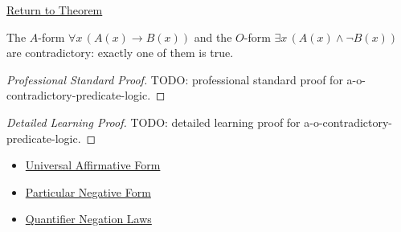 \newpage
{}
\label{prf:a-o-contradictory-predicate-logic}

\begin{remark*}[Return]
\hyperref[prop:a-o-contradictory-predicate-logic]{Return to Theorem}
\end{remark*}

\begin{proposition*}[A-O Contradiction]
The \(A\)-form \(\forall x\,(A(x)\to B(x))\) and the \(O\)-form
\(\exists x\,(A(x)\land \neg B(x))\) are contradictory: exactly one of them is
true.
\end{proposition*}

\begin{proof}[Professional Standard Proof]
\LRAProofBodyStart
TODO: professional standard proof for a-o-contradictory-predicate-logic.
\end{proof}

\begin{proof}[Detailed Learning Proof]
\LRAProofBodyStart
TODO: detailed learning proof for a-o-contradictory-predicate-logic.
\end{proof}

\begin{remark*}
\end{remark*}

\begin{dependencies}
\begin{itemize}
  \item \hyperref[def:categorical-a-form-predicate-logic]{Universal Affirmative Form}
  \item \hyperref[def:categorical-o-form-predicate-logic]{Particular Negative Form}
  \item \hyperref[thm:qneg]{Quantifier Negation Laws}
\end{itemize}
\end{dependencies}

\clearpage
